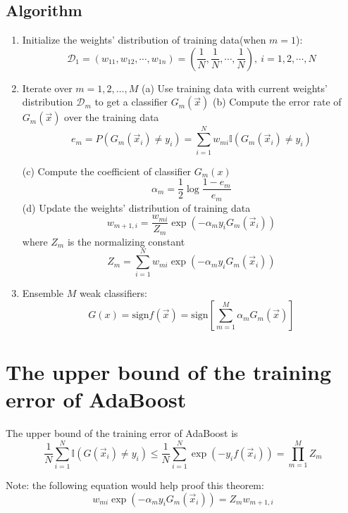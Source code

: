 \subsection{Algorithm}

\begin{enumerate}
\item Initialize the weights' distribution of training data(when $m=1$):
\begin{equation}\nonumber
\mathcal{D}_1=(w_{11},w_{12},\cdots,w_{1n})=(\frac{1}{N},\frac{1}{N},\cdots,\frac{1}{N}),\ i=1,2,\cdots,N
\end{equation}
\item Iterate over $m=1,2,\dotsc,M$
\subitem (a) Use training data with current weights' distribution $\mathcal{D}_m$ to get a classifier $G_m(\vec{x})$
\subitem (b) Compute the error rate of $G_m(\vec{x})$ over the training data \\
\begin{equation}
e_m=P(G_m(\vec{x}_i)\neq y_i)=\sum_{i=1}^N {w_{mi}\mathbb{I}(G_m(\vec{x}_i) \neq y_i)}
\end{equation}

\subitem (c) Compute the coefficient of classifier $G_m(x)$
\begin{equation}
\alpha_m = \frac{1}{2}\log{\frac{1-e_m}{e_m}}
\end{equation}
\subitem (d) Update the weights' distribution of training data
\begin{equation}
w_{m+1,i}=\frac{w_{mi}}{Z_m}\exp(-\alpha_m y_i G_m(\vec{x}_i))
\end{equation}
where $Z_m$ is the normalizing constant
\begin{equation}
Z_m=\sum_{i=1}^N w_{mi}\exp(-\alpha_m y_i G_m(\vec{x}_i))
\end{equation}

\item Ensemble $M$ weak classifiers:
\begin{equation}
G(x)=\text{sign}f(\vec{x})=\text{sign}\left[\sum_{m=1}^M \alpha_m G_m(\vec{x})\right]
\end{equation}
\end{enumerate} 

\section{The upper bound of the training error of AdaBoost}
\begin{theorem}
The upper bound of the training error of AdaBoost is 
\begin{equation}
\frac{1}{N} \sum_{i=1}^N \mathbb{I}(G(\vec{x}_i)\neq y_i) \leq \frac{1}{N} \sum_{i=1}^N \exp(-y_i f(\vec{x}_i))=\prod_{m=1}^M Z_m
\end{equation}

Note: the following equation would help proof this theorem:
\begin{equation}
w_{mi}\exp(-\alpha_m y_i G_m(\vec{x}_i))=Z_m w_{m+1,i}
\end{equation}
\end{theorem}
